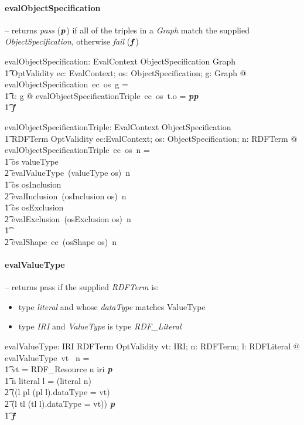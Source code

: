 \documentclass[fuzz]{llncs}
\def\entryFor{\cdot}
\def\pass{\textbf{\textit{p}}}
\def\fail{\textbf{\textit{f}}}
\def\zc{\textit}
\begin{document}
\paragraph{evalObjectSpecification} -- returns \zc{pass} ($\pass$) if all of the triples in a \zc{Graph} 
match the supplied \zc{ObjectSpecification}, otherwise \zc{fail} ($\fail$)
\begin{gendef}
   evalObjectSpecification: EvalContext \fun ObjectSpecification \fun Graph \fun \\
\t1 OptValidity
\where
   \forall ec: EvalContext; os: ObjectSpecification; g: Graph @ \\ evalObjectSpecification~ec~os~g = \\
\t1 \IF \forall t: g @ evalObjectSpecificationTriple~ec~os~t.o = \pass \THEN \pass \\
\t1 \ELSE \fail
\end{gendef}
\begin{gendef}
   evalObjectSpecificationTriple: EvalContext \fun ObjectSpecification \fun \\
\t1 RDFTerm \fun OptValidity
\where
   \forall ec:EvalContext; os: ObjectSpecification; n: RDFTerm @ \\
  evalObjectSpecificationTriple~ec~os~n = \\
\t1 \IF os \in \ran valueType \THEN \\
\t2 evalValueType~(valueType \entryFor os)~n \\
\t1 \ELSE \IF os \in \ran osInclusion \THEN \\
\t2 evalInclusion~(osInclusion \entryFor os)~n \\
\t1 \ELSE \IF os \in \ran osExclusion \THEN \\
\t2 evalExclusion~(osExclusion \entryFor os)~n \\
\t1 \ELSE \\
\t2 evalShape~ec~(osShape \entryFor os)~n
\end{gendef}


\paragraph{evalValueType} -- returns pass if the supplied \zc{RDFTerm} is:
\begin{itemize}
\item type \zc{literal} and whose \zc{dataType} matches ValueType
\item type \zc{IRI} and \zc{ValueType} is type \zc{RDF\_Literal}
\end{itemize}
\begin{gendef}
   evalValueType: IRI \pfun RDFTerm \pfun OptValidity
\where
   \forall vt: IRI; n: RDFTerm; l: RDFLiteral @ evalValueType~vt~ n = \\
\t1 \IF vt = RDF\_Resource \land  n \in \ran iri \THEN \pass \\
\t1 \ELSE \IF n \in \ran literal \land l = (literal \entryFor n) \land \\
\t2 ((l \in \ran pl \land (pl \entryFor l).dataType = vt) \lor \\
\t2  (l \in \ran tl \land (tl \entryFor l).dataType = vt)) \THEN \pass \\
\t1 \ELSE \fail
\end{gendef}
\end{document}
